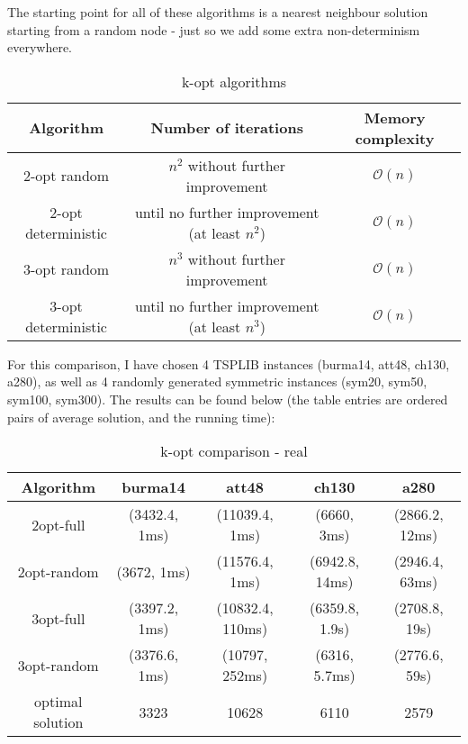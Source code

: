 \documentclass[12pt,twoside,notitlepage]{report}
\begin{document}
The starting point for all of these algorithms is a nearest neighbour solution starting from a random node - just so we add some extra non-determinism everywhere.

\begin{table}[h!]
\centering
\begin{tabular}{||c | c | c||} 
 \hline
 Algorithm & Number of iterations & Memory complexity \\ [0.5ex] 
 \hline\hline
 2-opt random & $n^2$ without further improvement & $\mathcal{O}(n)$ \\
 2-opt deterministic & until no further improvement (at least $n^2$) & $\mathcal{O}(n)$ \\
 3-opt random  & $n^3$ without further improvement & $\mathcal{O}(n)$ \\
 3-opt deterministic  & until no further improvement (at least $n^3$) & $\mathcal{O}(n)$ \\
 \hline
\end{tabular}
\caption{k-opt algorithms}
\label{table:3}
\end{table}

For this comparison, I have chosen 4 TSPLIB instances (burma14, att48, ch130, a280), as well as 4 randomly generated symmetric instances (sym20, sym50, sym100, sym300). The results can be found below (the table entries are ordered pairs of average solution, and the running time):

\begin{table}[h!]
\centering
\begin{tabular}{||c || c | c | c | c||} 
 \hline
 Algorithm & burma14 & att48 & ch130 & a280 \\ [0.5ex] 
 \hline\hline
 2opt-full & (3432.4, 1ms) & (11039.4, 1ms) & (6660, 3ms) & (2866.2, 12ms) \\
 2opt-random & (3672, 1ms) & (11576.4, 1ms) & (6942.8, 14ms) & (2946.4, 63ms) \\
 3opt-full & (3397.2, 1ms) & (10832.4, 110ms) & (6359.8, 1.9s) & (2708.8, 19s) \\
 3opt-random & (3376.6, 1ms) & (10797, 252ms) & (6316, 5.7ms) & (2776.6, 59s) \\
 \hline\hline
 optimal solution & 3323 & 10628 & 6110 & 2579 \\
 \hline
\end{tabular}
\caption{k-opt comparison - real}
\label{comparison:2}
\end{table}
\end{document}
